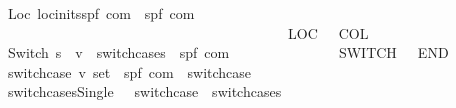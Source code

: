 \begin{isabellebody}
\ \ {\isachardoublequoteopen}{\isacharunderscore}Loc{\isachardoublequoteclose}{\isacharcolon}{\isacharcolon}\ {\isachardoublequoteopen}{\isacharbrackleft}locinits{\isacharcomma}{\isacharparenleft}{\isacharprime}s{\isacharcomma}{\isacharprime}p{\isacharcomma}{\isacharprime}f{\isacharparenright}\ com{\isacharbrackright}\ {\isasymRightarrow}\ {\isacharparenleft}{\isacharprime}s{\isacharcomma}{\isacharprime}p{\isacharcomma}{\isacharprime}f{\isacharparenright}\ com{\isachardoublequoteclose}\isanewline
\ \ \ \ \ \ \ \ \ \ \ \ \ \ \ \ \ \ \ \ \ \ \ \ \ \ \ \ \ \ \ \ \ \ \ \ \ \ \ \ \ {\isacharparenleft}{\isachardoublequoteopen}{\isacharparenleft}{}\ LOC\ {\isacharunderscore}{\isacharsemicolon}{\isacharsemicolon}{\isacharslash}\ {\isacharparenleft}{\isacharunderscore}{\isacharparenright}\ COL{\isacharparenright}{\isachardoublequoteclose}\ {\isacharbrackleft}{}{\isacharcomma}{}{\isacharbrackright}\ {}{}{\isacharparenright}\isanewline
\ \ {\isachardoublequoteopen}{\isacharunderscore}Switch{\isachardoublequoteclose}{\isacharcolon}{\isacharcolon}\ {\isachardoublequoteopen}{\isacharparenleft}{\isacharprime}s\ {\isasymRightarrow}\ {\isacharprime}v{\isacharparenright}\ {\isasymRightarrow}\ switchcases\ {\isasymRightarrow}\ {\isacharparenleft}{\isacharprime}s{\isacharcomma}{\isacharprime}p{\isacharcomma}{\isacharprime}f{\isacharparenright}\ com{\isachardoublequoteclose}\isanewline
\ \ \ \ \ \ \ \ \ \ \ \ \ \ {\isacharparenleft}{\isachardoublequoteopen}{\isacharparenleft}{}\ SWITCH\ {\isacharparenleft}{\isacharunderscore}{\isacharparenright}{\isacharslash}\ {\isacharunderscore}\ END{\isacharparenright}{\isachardoublequoteclose}\ {\isacharbrackleft}{}{}{\isacharcomma}{}{\isacharbrackright}\ {}{}{\isacharparenright}\isanewline
\ \ {\isachardoublequoteopen}{\isacharunderscore}switchcase{\isachardoublequoteclose}{\isacharcolon}{\isacharcolon}\ {\isachardoublequoteopen}{\isacharprime}v\ set\ {\isasymRightarrow}\ {\isacharparenleft}{\isacharprime}s{\isacharcomma}{\isacharprime}p{\isacharcomma}{\isacharprime}f{\isacharparenright}\ com\ {\isasymRightarrow}\ switchcase{\isachardoublequoteclose}\ {\isacharparenleft}{\isachardoublequoteopen}{\isacharunderscore}{\isasymRightarrow}{\isacharslash}\ {\isacharunderscore}{\isachardoublequoteclose}\ {\isacharparenright}\isanewline
\ \ {\isachardoublequoteopen}{\isacharunderscore}switchcasesSingle{\isachardoublequoteclose}\ \ {\isacharcolon}{\isacharcolon}\ {\isachardoublequoteopen}switchcase\ {\isasymRightarrow}\ switchcases{\isachardoublequoteclose}\ {\isacharparenleft}{\isachardoublequoteopen}{\isacharunderscore}{\isachardoublequoteclose}{\isacharparenright}\ \ \ \ \ \ \ \ \ \isanewline

\end{isabellebody}
